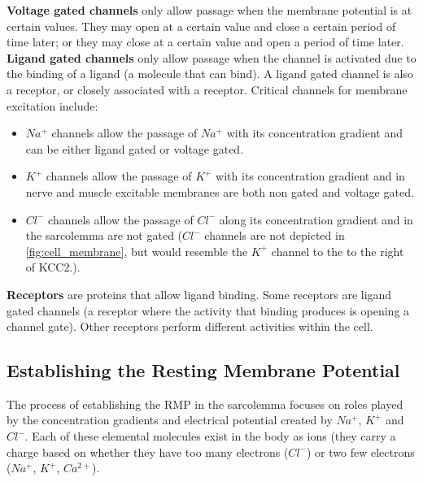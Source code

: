 \textbf{Voltage gated channels} only allow passage when the membrane potential is at certain values. They may open at a certain value and close a certain period of time later; or they may close at a certain value and open a period of time later. 
\textbf{Ligand gated channels} only allow passage when the channel is activated due to the binding of a ligand (a molecule that can bind). A ligand gated channel is also a receptor, or closely associated with a receptor. Critical channels for membrane excitation include:

\begin{itemize}
    \item $Na^+$ channels allow the passage of $Na^+$ with its concentration gradient and can be either ligand gated or voltage gated.
    \item $K^+$ channels allow the passage of $K^+$ with its concentration gradient and in nerve and muscle excitable membranes are both non gated and voltage gated.
    \item $Cl^-$ channels allow the passage of $Cl^-$ along its concentration gradient and in the sarcolemma are not gated ($Cl^-$ channels are not depicted in \ref{fig:cell_membrane}, but would resemble the $K^+$ channel to the to the right of KCC2.).
\end{itemize}
  
\textbf{Receptors} are proteins that allow ligand binding. Some receptors are ligand gated channels (a receptor where the activity that binding produces is opening a channel gate). Other receptors perform different activities within the cell. 


\subsection{Establishing the Resting Membrane Potential}

The process of establishing the RMP in the sarcolemma focuses on roles played by the concentration gradients and electrical potential created by $Na^+$, $K^+$ and $Cl^-$. Each of these elemental molecules exist in the body as ions (they carry a charge based on whether they have too many electrons ($Cl^-$) or two few electrons ($Na^+$, $K^+$, $Ca^{2+}$).  

